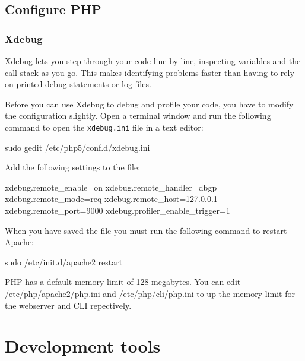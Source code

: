 \documentclass[draft,ebook,10pt,twoside,openright]{memoir}
\begin{document}
\section{Configure PHP}

\subsection{Xdebug}

Xdebug lets you step through your code line by line, inspecting variables and the call stack as you go. This makes identifying problems faster than having to rely on printed debug statements or log files.

Before you can use Xdebug to debug and profile your code, you have to modify the configuration slightly. Open a terminal window and run the following command to open the \verb!xdebug.ini! file in a text editor:

\begin{squashboxcommand}
sudo gedit /etc/php5/conf.d/xdebug.ini
\end{squashboxcommand}

Add the following settings to the file:

\begin{squashboxoutput}
xdebug.remote_enable=on
xdebug.remote_handler=dbgp
xdebug.remote_mode=req
xdebug.remote_host=127.0.0.1
xdebug.remote_port=9000
xdebug.profiler_enable_trigger=1
\end{squashboxoutput}


When you have saved the file you must run the following command to restart Apache:

\begin{squashboxcommand}
sudo /etc/init.d/apache2 restart
\end{squashboxcommand}

PHP has a default memory limit of 128 megabytes. You can edit /etc/php/apache2/php.ini and /etc/php/cli/php.ini to up the memory limit for the webserver and CLI repectively.

\chapter{Development tools} \label{chdevtools}
\end{document}
